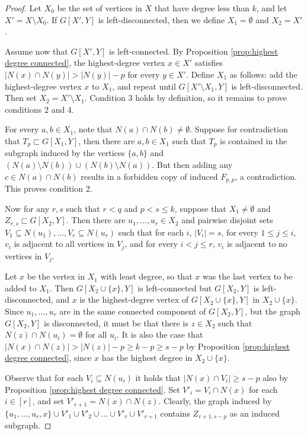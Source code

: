 \documentclass{article}
\begin{document}
\begin{proof}
	Let $X_0$ be the set of vertices in $X$ that have degree less than $k$,
	and let $X' = X \setminus X_0$. If $G[X', Y]$ is left-disconnected, then we define
	$X_1 = \emptyset$ and $X_2 = X'$.
	
	Assume now that $G[X', Y]$ is left-connected. By Proposition \ref{prop:highest degree connected}, the highest-degree vertex $x \in X'$ satisfies $|N(x) \cap N(y)| > |N(y)|-p$ for every $y \in X'$. Define $X_1$ as follows: add the highest-degree vertex $x$ to $X_1$, and repeat until $G[X' \setminus X_1,Y]$ is left-disconnected. Then set $X_2 = X' \setminus X_1$.  Condition 3 holds by definition, so it remains to prove conditions 2 and 4.

	For every $a,b \in X_1$, note that $N(a) \cap N(b) \neq \emptyset$. Suppose for contradiction that
	$T_p \sqsubset G[X_1,Y]$, then there are $a,b \in X_1$ such that $T_p$ is contained in the subgraph induced by the vertices $\{a,b\}$ and $(N(a) \setminus N(b)) \cup (N(b) \setminus N(a))$.  But then adding any $c \in N(a) \cap N(b)$ results in a forbidden copy of induced $F_{p,p}$, a contradiction. This proves condition 2.


Now for any $r, s$ such that $r < q$ and $p < s \leq k$, suppose that $X_1 \neq \emptyset$ and $Z_{r,s} \sqsubset G[X_2,Y]$. Then there are $u_1, \dotsc, u_r \in X_2$ and pairwise disjoint sets $V_1 \subseteq N(u_1), \dotsc, V_r \subseteq N(u_r)$ such that for
each $i$, $|V_i| = s$, for every $1 \leq j \leq i$, $v_i$ is adjacent to all vertices in $V_j$, and
for every $i < j \leq r$, $v_i$ is adjacent to no vertices in $V_j$.

Let $x$ be the vertex in $X_1$ with least degree, so that $x$ was the last vertex to be added to
$X_1$. Then $G[X_2 \cup \{x\},Y]$ is left-connected but $G[X_2,Y]$ is left-disconnected, and $x$ is
the highest-degree vertex of $G[X_2 \cup \{x\},Y]$ in $X_2 \cup \{x\}$. Since $u_1, \dotsc, u_r$ are
in the same connected component of $G[X_2,Y]$, but the graph $G[X_2,Y]$ is disconnected, it must be that there is $z \in X_2$ such that $N(z) \cap N(u_i) = \emptyset$ for all $u_i$. 
It is also the case that $|N(x) \cap N(z)| > |N(z)|-p \geq k-p \geq s-p$ by Proposition \ref{prop:highest degree connected}, since $x$ has the highest degree in $X_2 \cup \{x\}$.

Observe that for each $V_i \subseteq N(u_i)$ it holds that $|N(x) \cap V_i| \geq s - p$ also by
Proposition \ref{prop:highest degree connected}. Set $V'_i = V_i \cap N(x)$ for each $i \in [r]$,
and set $V'_{r+1} = N(x) \cap N(z)$.
%
Clearly, the graph induced by
$\{u_1, \dotsc, u_r, x\} \cup V'_1 \cup V'_2 \cup \ldots \cup V'_r \cup V'_{r+1}$ contains 
$Z_{r+1,s-p}$ as an induced subgraph.
\end{proof}
\end{document}

